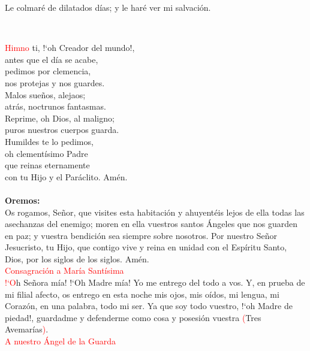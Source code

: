 \documentclass[9pt]{article}
\begin{document}
\begin{multicols}{2}
      Le colmaré de dilatados días; y le haré ver mi salvación.\\
      \begin{otherlanguage}{latin}
            \\[2mm]
      \end{otherlanguage}
      \noindent\textcolor{red}{Himno}
      ti, {!`}oh Creador del mundo!,\\
      antes que el día se acabe,\\
      pedimos por clemencia,\\
      nos protejas y nos guardes.\\
      Malos sueños, alejaos;\\
      atrás, noctrunos fantasmas.\\
      Reprime, oh Dios, al maligno;\\
      puros nuestros cuerpos guarda.\\
      Humildes te lo pedimos,\\
      oh clementísimo Padre\\
      que reinas eternamente\\
      con tu Hijo y el Paráclito. Amén.\\[1mm]
      \\[1mm]
      \textbf{Oremos:}\\
      Os rogamos, Señor, que visites esta habitación y ahuyentéis lejos de ella todas las asechanzas del enemigo; moren en ella vuestros santos Ángeles
      que nos guarden en paz; y vuestra bendición sea siempre sobre nosotros. Por nuestro Señor Jesucristo, tu Hijo, que contigo vive y reina en unidad
      con el Espíritu Santo, Dios, por los siglos de los siglos. Amén.\\[2mm]
      \textcolor{red}{Consagración a María Santísima}\\
      \textcolor{red}{{!`}O}h Señora mía! {!`}Oh Madre mía! Yo me entrego del todo a vos. Y, en prueba de mi filial afecto, os entrego en esta noche mis ojos, mis oídos, mi lengua, mi Corazón,
      en una palabra, todo mi ser. Ya que soy todo vuestro, {!`}oh Madre de piedad!, guardadme y defenderme como cosa y posesión vuestra \textcolor{red}{(}Tres Avemarías\textcolor{red}{)}.\\[1mm]
      \textcolor{red}{A nuestro Ángel de la Guarda}\\
      \\[1mm]

\end{multicols}
\end{document}
